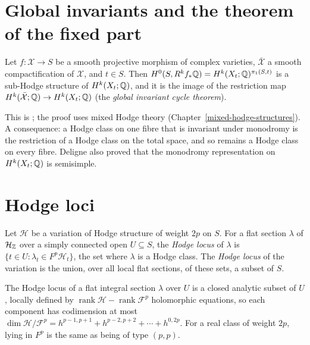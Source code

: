 \section{Global invariants and the theorem of the fixed part}\label{vhs:section-fixed-part}

\begin{theorem}\label{vhs:theorem-fixed-part}
Let $f \colon \mathcal{X} \to S$ be a smooth projective morphism of complex varieties, $\bar{\mathcal{X}}$ a smooth compactification of $\mathcal{X}$, and $t \in S$. Then
$H^0(S, R^kf_*\mathbb{Q}) = H^k(X_t; \mathbb{Q})^{\pi_1(S, t)}$ is a sub-Hodge structure of $H^k(X_t; \mathbb{Q})$, and it is the image of the restriction map $H^k(\bar{\mathcal{X}}; \mathbb{Q}) \to H^k(X_t; \mathbb{Q})$
(the \emph{global invariant cycle theorem}).
\end{theorem}

This is \cite[Th\'eor\`eme 4.1.1 and Corollaire 4.1.2]{deligne-hodge-2}; the proof uses mixed Hodge theory (Chapter~\ref{mixed-hodge-structures}). A consequence: a Hodge class on one fibre that
is invariant under monodromy is the restriction of a Hodge class on the total space, and so remains a Hodge class on every fibre. Deligne also proved that the monodromy representation
on $H^k(X_t; \mathbb{Q})$ is semisimple.

\section{Hodge loci}\label{vhs:section-hodge-loci}

\begin{definition}\label{vhs:definition-hodge-locus}
Let $\mathcal{H}$ be a variation of Hodge structure of weight $2p$ on $S$. For a flat section $\lambda$ of $\mathcal{H}_{\mathbb{Z}}$ over a simply connected open $U \subseteq S$, the \emph{Hodge locus} of $\lambda$
is $\{t \in U : \lambda_t \in F^p\mathcal{H}_t\}$, the set where $\lambda$ is a Hodge class. The \emph{Hodge locus} of the variation is the union, over all local flat sections, of these sets, a subset of
$S$.
\end{definition}

\begin{proposition}\label{vhs:proposition-hodge-locus-analytic}
The Hodge locus of a flat integral section $\lambda$ over $U$ is a closed analytic subset of $U$, locally defined by $\operatorname{rank}\mathcal{H} - \operatorname{rank}\mathcal{F}^p$ holomorphic equations, so each
component has codimension at most $\dim\mathcal{H}/\mathcal{F}^p = h^{p-1,p+1} + h^{p-2,p+2} + \cdots + h^{0,2p}$. For a real class of weight $2p$, lying in $F^p$ is the same as being of type $(p,p)$.
\end{proposition}

